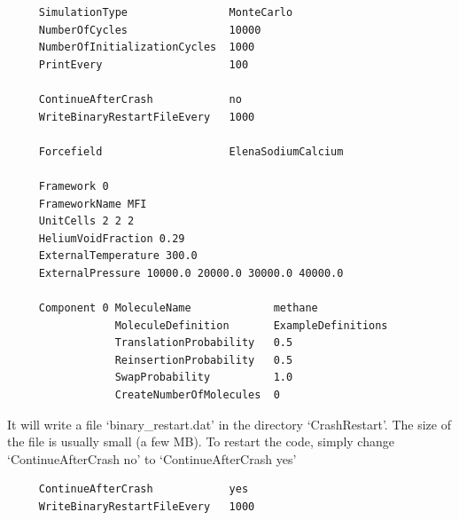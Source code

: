 \begin{tiny}
\begin{verbatim}
     SimulationType                MonteCarlo
     NumberOfCycles                10000
     NumberOfInitializationCycles  1000
     PrintEvery                    100

     ContinueAfterCrash            no
     WriteBinaryRestartFileEvery   1000

     Forcefield                    ElenaSodiumCalcium

     Framework 0
     FrameworkName MFI
     UnitCells 2 2 2
     HeliumVoidFraction 0.29
     ExternalTemperature 300.0
     ExternalPressure 10000.0 20000.0 30000.0 40000.0

     Component 0 MoleculeName             methane
                 MoleculeDefinition       ExampleDefinitions
                 TranslationProbability   0.5
                 ReinsertionProbability   0.5
                 SwapProbability          1.0
                 CreateNumberOfMolecules  0
\end{verbatim}
\end{tiny}
It will write a file `binary\_restart.dat' in the directory `CrashRestart'. The size of the file is usually small (a few MB).
To restart the code, simply change `ContinueAfterCrash no' to `ContinueAfterCrash yes'
\begin{tiny}
\begin{verbatim}
     ContinueAfterCrash            yes
     WriteBinaryRestartFileEvery   1000
\end{verbatim}
\end{tiny}

\newpage



